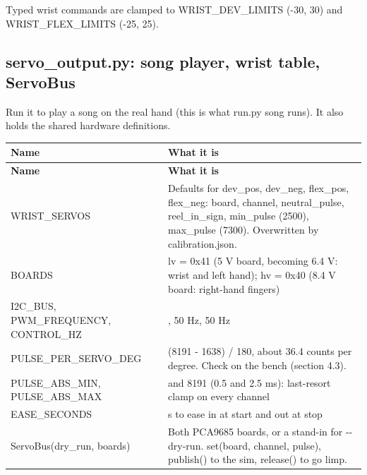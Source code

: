\documentclass[11pt,letterpaper]{article}
\newcommand{\code}[1]{\textcolor{codeblue}{\ttfamily\smaller\relax #1}}
\begin{document}
Typed wrist commands are clamped to \code{WRIST\_\allowbreak{}DEV\_\allowbreak{}LIMITS} (-30, 30) and \code{WRIST\_\allowbreak{}FLEX\_\allowbreak{}LIMITS} (-25, 25).


\subsection{servo\_output.py: song player, wrist table, ServoBus}
Run it to play a song on the real hand (this is what \code{run.py song} runs). It also holds the shared hardware definitions.

{\small
\begin{longtable}{|>{\raggedright\arraybackslash}p{}|>{\raggedright\arraybackslash}p{}|}
\hline
\rowcolor{tblhead}\textbf{Name} & \textbf{What it is} \\ \hline
\endfirsthead
\hline
\rowcolor{tblhead}\textbf{Name} & \textbf{What it is} \\ \hline
\endhead
\code{WRIST\_\allowbreak{}SERVOS} & Defaults for \code{dev\_\allowbreak{}pos}, \code{dev\_\allowbreak{}neg}, \code{flex\_\allowbreak{}pos}, \code{flex\_\allowbreak{}neg}: board, channel, \code{neutral\_\allowbreak{}pulse}, \code{reel\_\allowbreak{}in\_\allowbreak{}sign}, \code{min\_\allowbreak{}pulse} (2500), \code{max\_\allowbreak{}pulse} (7300). Overwritten by \code{calibration.json}. \\ \hline
\code{BOARDS} & \code{lv} = 0x41 (5 V board, becoming 6.4 V: wrist and left hand); \code{hv} = 0x40 (8.4 V board: right-hand fingers) \\ \hline
\code{I2C\_\allowbreak{}BUS}, \code{PWM\_\allowbreak{}FREQUENCY}, \code{CONTROL\_\allowbreak{}HZ} & 7, 50 Hz, 50 Hz \\ \hline
\code{PULSE\_\allowbreak{}PER\_\allowbreak{}SERVO\_\allowbreak{}DEG} & (8191 - 1638) / 180, about 36.4 counts per degree. Check on the bench (section 4.3). \\ \hline
\code{PULSE\_\allowbreak{}ABS\_\allowbreak{}MIN}, \code{PULSE\_\allowbreak{}ABS\_\allowbreak{}MAX} & 1638 and 8191 (0.5 and 2.5 ms): last-resort clamp on every channel \\ \hline
\code{EASE\_\allowbreak{}SECONDS} & 0.5 s to ease in at start and out at stop \\ \hline
\code{ServoBus(dry\_\allowbreak{}run,\allowbreak{} boards)} & Both PCA9685 boards, or a stand-in for \code{-{}-{}dry-{}\allowbreak{}run}. \code{set(board,\allowbreak{} channel,\allowbreak{} pulse)}, \code{publish()} to the sim, \code{release()} to go limp. \\ \hline

\end{longtable}}
\end{document}
